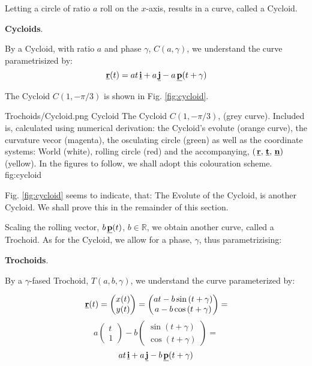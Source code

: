 Letting a circle of ratio $a$ roll on the $x$-axis, results in a curve,
called a Cycloid.

\begin{Definition}
  \textbf{Cycloids}.
  
By a Cycloid, with ratio $a$ and phase $\gamma$,
$C(a,\gamma)$, we understand 
the curve parametrisized by:
\[
 \hspace{0.05cm} \underline{\mathbf{r}}(t)
  =
  at\hspace{0.05cm} \underline{\mathbf{i}}+a\hspace{0.05cm} \underline{\mathbf{j}}
  -a \hspace{0.05cm} \underline{\mathbf{p}}(t+\gamma)
\]

The Cycloid $C(1,-\pi/3)$ is shown in Fig. \ref{fig:cycloid}.
\end{Definition}


\Figure
{Trochoids/Cycloid.png}
{Cycloid}
{
  The Cycloid $C(1,-\pi/3)$, (grey curve).
  Included is, calculated using numerical derivation:
  the Cycloid's evolute (orange curve),
  the curvature vecor (magenta), the osculating circle (green)
  as well as the coordinate systems: World (white), rolling circle (red)
  and the accompanying, $(\hspace{0.05cm} \underline{\mathbf{r}},\hspace{0.05cm} \underline{\mathbf{t}},\hspace{0.05cm} \underline{\mathbf{n}})$ (yellow).
  In the figures to follow, we shall adopt this colouration scheme.
}
{fig:cycloid}

Fig. \ref{fig:cycloid} seems to indicate, that:  The Evolute of the Cycloid,
is another Cycloid. We shall prove this in the remainder of this section.


   Scaling the rolling vector, $b\hspace{0.05cm} \underline{\mathbf{p}}(t)$, $b \in \mathbb{R}$,
   we obtain another curve, called
   a Trochoid. As for the Cycloid,  we allow for a phase, $\gamma$, 
   thus parametrizising:
   

\begin{Definition}
  \textbf{Trochoids}.
  
   By a $\gamma$-fased Trochoid, $T(a,b,\gamma)$, we understand the curve
   parameterized by:
   
\[
  \hspace{0.05cm} \underline{\mathbf{r}}(t)
 =
  \begin{pmatrix}
   x(t)\\y(t)
  \end{pmatrix}
  =
  \begin{pmatrix}
   at-b\sin{(t+\gamma)}\\a-b\cos{(t+\gamma)}
  \end{pmatrix}
  =
  \]
  \[
  a
  \begin{pmatrix}
   t\\1
  \end{pmatrix}
   -
   b
  \begin{pmatrix}
  \sin{(t+\gamma)}\\\cos{(t+\gamma)}
  \end{pmatrix}
 =
 \]
 \[
  at\hspace{0.05cm} \underline{\mathbf{i}}+a\hspace{0.05cm} \underline{\mathbf{j}}
  -b \hspace{0.05cm} \underline{\mathbf{p}}(t+\gamma)
\]
\end{Definition}

